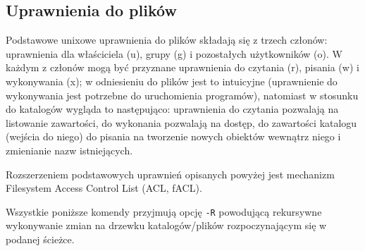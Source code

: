 \documentclass{pdfBooklets}
\begin{document}
\subsection{Uprawnienia do plików}
Podstawowe unixowe uprawnienia do plików składają się z trzech członów: uprawnienia dla właściciela (u), grupy (g) i pozostałych użytkowników (o).
W każdym z członów mogą być przyznane uprawnienia do czytania (r), pisania (w) i wykonywania (x); w odniesieniu do plików jest to intuicyjne (uprawnienie do wykonywania jest potrzebne do uruchomienia programów), natomiast w stosunku do katalogów wygląda to następująco: uprawnienia do czytania pozwalają na listowanie zawartości, do wykonania pozwalają na dostęp, do zawartości katalogu (wejścia do niego) do pisania na tworzenie nowych obiektów wewnątrz niego i zmienianie nazw istniejących.

Rozszerzeniem podstawowych uprawnień opisanych powyżej jest mechanizm Filesystem Access Control List (ACL, fACL).

Wszystkie poniższe komendy przyjmują opcję \texttt{-R} powodującą rekursywne wykonywanie zmian na drzewku katalogów/plików rozpoczynającym się w podanej ścieżce.
\end{document}
